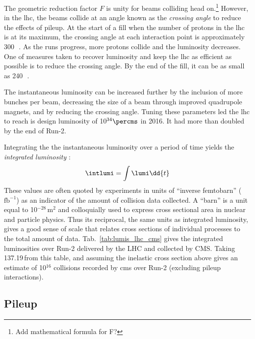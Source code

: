 The geometric reduction factor $F$ is unity for beams colliding head on.\footnote{Add mathematical formula for F?} However, in the \acrshort{lhc}, the beams collide at an angle known as the \emph{crossing angle} to reduce the effects of \gls{pileup}. At the start of a fill when the number of protons in the \acrshort{lhc} is at its maximum, the crossing angle at each interaction point is approximately 300\,\si{\micro{}}. As the runs progress, more protons collide and the luminosity decreases. One of measures taken to recover luminosity and keep the \acrshort{lhc} as efficient as possible is to reduce the crossing angle. By the end of the fill, it can be as small as 240\,\si{\micro{}}.


The instantaneous luminosity can be increased further by the inclusion of more bunches per beam, decreasing the size of a beam through improved quadrupole magnets, and by reducing the crossing angle. Tuning these parameters led the \acrshort{lhc} to reach is design luminosity of 10$^{34}\percms$ in 2016. It had more than doubled by the end of Run-2.

Integrating the the instantaneous luminosity over a period of time yields the \emph{integrated luminosity} \intlumi:
\begin{equation}
    \intlumi = \int \lumi \dd{t}
    \label{eq:lumi_integrated}
\end{equation}
These values are often quoted by experiments in units of ``inverse femtobarn'' ($\text{fb}^{-1}$) as an indicator of the amount of collision data collected. A ``barn'' is a unit equal to 10$^{-28}$\,m$^2$ and colloquially used to express cross sectional area in nuclear and particle physics. Thus its reciprocal, the same units as integrated luminosity, gives a good sense of scale that relates cross sections of individual processes to the total amount of data. Tab.~\ref{tab:lumis_lhc_cms} gives the integrated luminosities over Run-2 delivered by the LHC and collected by CMS. Taking 137.19\,\fbinv from this table, and assuming the inelastic \pp cross section above gives an estimate of 10$^{16}$ collisions recorded by \acrshort{cms} over Run-2 (excluding \gls{pileup} interactions).




\subsection{Pileup}
\label{subsec:pileup}

